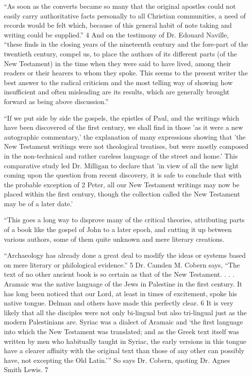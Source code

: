 ``As soon as the converts became so many that the original apostles could not easily carry
authoritative facts personally to all Christian communities, a need of records would be felt
which, because of this general habit of note taking and writing could be supplied.'' 4 And on
the testimony of Dr. Edouard Naville, ``these finds in the closing years of the nineteenth
century and the fore-part of the twentieth century, compel us, to place the authors of its
different parts (of the New Testament) in the time when they were said to have lived, among
their readers or their hearers to whom they spoke. This seems to the present writer the best
answer to the radical criticism and the most telling way of showing how insufficient and
often misleading are its results, which are generally brought forward as being above
discussion.''

``If we put side by side the gospels, the epistles of Paul, and the writings which have been
discovered of the first century, we shall find in those 'as it were a new autographic
commentary,' the explanation of many expressions showing that 'the New Testament writings
were not theological treatises, but were mostly composed in the non-technical and rather
careless language of the street and home.' This comparative study led Dr. Milligan to declare
that 'in view of all the new light coming upon the question from recent discovery, it is safe to
conclude that with the probable exception of 2 Peter, all our New Testament writings may
now be placed within the first century, though the collection called the New Testament may
be of a later date.'

``This goes a long way to disprove many of the critical theories, attributing parts of a book
like the gospel of John to a later epoch, and cutting it up between various authors, some of
them quite unknown and mere literary creations.

``Archaeology has already done a great deal to modify the ideas or systems based on mere
literary or philological evidence.'' 5 Dr. Camden M. Cobern says, ``The text of no other
ancient book is so certain as that of the New Testament. . . . Aramaic was the native language
of the Jews in Palestine in the first century. It has long been noticed that our Lord, at least in
times of excitement, spoke his native tongue. Delman and others have made this perfectly
clear. 6 It is very likely that all the disciples were not only bi-lingual but also tri-lingual just
as the modern Palestinians are. Syriac was a dialect of Aramaic and `the first language into
which the New Testament was translated; and as the Greek text itself was written by men
who habitually taught in Syriac, the early versions in this tongue have a clearer affinity with
the original text than those of any other can possibly have, not excepting the Old Latin.''' So
says Dr. Cobern, quoting Dr. Agnes Smith Lewis. 7

